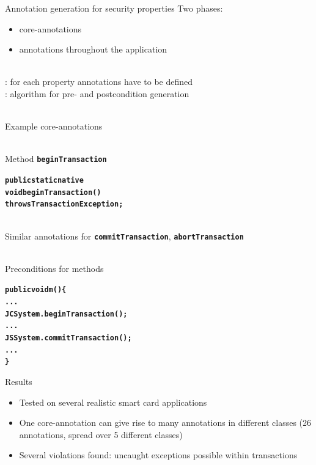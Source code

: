 \documentclass[final,nocolorBG,a4,mobius,nototal,pdf,slideColor]{prosper}
\newcommand{\textttbf}[1]{\texttt{\textbf{#1}}}
\begin{document}
\begin{slide}{Annotation generation for security properties}
Two phases:
\begin{itemize}
\item {} core-annotations
\item {} annotations throughout the application
\end{itemize}
\ \smallskip\\
: for each property annotations have to be defined
\bigskip\\
: algorithm for pre- and postcondition generation\\ \ \\
\end{slide}

\begin{slide}{Example core-annotations}
\begin{alltt}
\end{alltt}
\ \smallskip\\
Method \textttbf{beginTransaction}
\begin{alltt}
\textbf{public static native 
   void beginTransaction() 
        throws TransactionException;}
\end{alltt}
\ \smallskip\\
Similar annotations for \textttbf{commitTransaction},
\textttbf{abortTransaction} \\ \
\end{slide}


\begin{slide}{Preconditions for methods}
\begin{alltt}
\textbf{public void m() \{
   ...
   JCSystem.beginTransaction();
   ...
   JSSystem.commitTransaction();
   ...
   \}}
\end{alltt}
\end{slide}

\begin{slide}{Results}
\begin{itemize}
\item Tested on several realistic smart card applications
\item One core-annotation can give rise to many annotations in
different classes (26 annotations, spread over 5 different classes)
\item Several violations found: uncaught exceptions possible within
transactions 
\end{itemize}
\end{slide}
\end{document}
